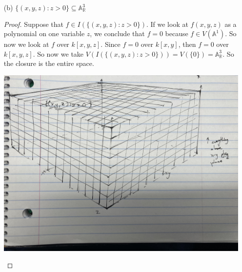 \documentclass{article}
\begin{document}
\begin{itemize}
        \item [(b)] $\{(x, y, z) : z > 0\} \subseteq \mathbb{A}^{3}_{\mathbb{R}}$
            \begin{proof}
                Suppose that $f \in I(\{(x, y, z) : z > 0\})$. If we look at $f(x, y, z)$ as a polynomial on one variable $z$, we conclude that $f = 0$ because $f \in V(\mathbb{A}^{1})$. So now we look at $f$ over $k[x, y, z]$. Since $f = 0$ over $k[x, y]$, then $f = 0$ over $k[x, y, z]$. So now we take $V(I(\{(x, y, z) : z > 0\})) = V(\{0\}) = \mathbb{A}^{3}_{\mathbb{R}}$. So the closure is the entire space. 
                    \begin{center}
                        \includegraphics[scale=.07]{first}
                    \end{center}
            \end{proof}


\end{itemize}
\end{document}

